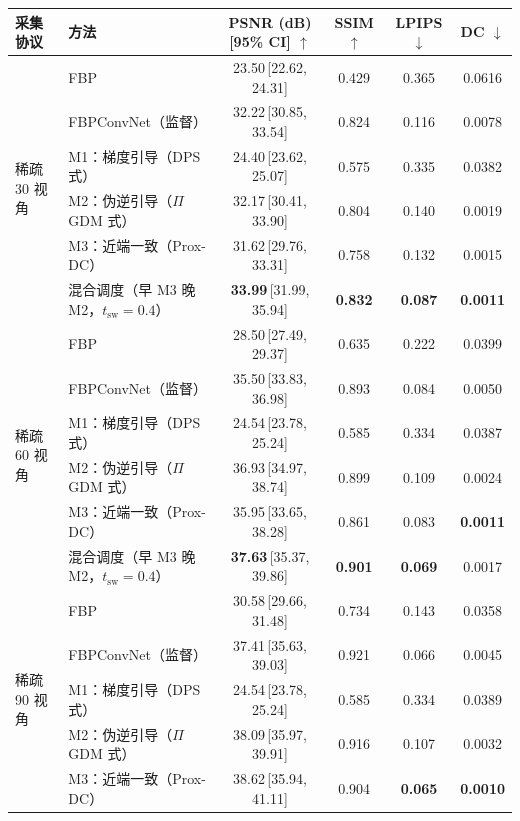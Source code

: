 \begin{tabular}{llcccc}
\toprule
采集协议 & 方法 & PSNR (dB) [95\% CI] $\uparrow$ & SSIM $\uparrow$ & LPIPS $\downarrow$ & DC $\downarrow$ \\
\midrule
\multirow{6}{*}{稀疏 30 视角}
 & FBP & 23.50\,{\scriptsize[22.62, 24.31]} & 0.429 & 0.365 & 0.0616 \\
 & FBPConvNet（监督） & 32.22\,{\scriptsize[30.85, 33.54]} & 0.824 & 0.116 & 0.0078 \\
 & M1：梯度引导（DPS 式） & 24.40\,{\scriptsize[23.62, 25.07]} & 0.575 & 0.335 & 0.0382 \\
 & M2：伪逆引导（$\Pi$GDM 式） & 32.17\,{\scriptsize[30.41, 33.90]} & 0.804 & 0.140 & 0.0019 \\
 & M3：近端一致（Prox-DC） & 31.62\,{\scriptsize[29.76, 33.31]} & 0.758 & 0.132 & 0.0015 \\
 & 混合调度（早 M3 晚 M2，$t_{\mathrm{sw}}{=}0.4$） & \textbf{33.99}\,{\scriptsize[31.99, 35.94]} & \textbf{0.832} & \textbf{0.087} & \textbf{0.0011} \\
\midrule
\multirow{6}{*}{稀疏 60 视角}
 & FBP & 28.50\,{\scriptsize[27.49, 29.37]} & 0.635 & 0.222 & 0.0399 \\
 & FBPConvNet（监督） & 35.50\,{\scriptsize[33.83, 36.98]} & 0.893 & 0.084 & 0.0050 \\
 & M1：梯度引导（DPS 式） & 24.54\,{\scriptsize[23.78, 25.24]} & 0.585 & 0.334 & 0.0387 \\
 & M2：伪逆引导（$\Pi$GDM 式） & 36.93\,{\scriptsize[34.97, 38.74]} & 0.899 & 0.109 & 0.0024 \\
 & M3：近端一致（Prox-DC） & 35.95\,{\scriptsize[33.65, 38.28]} & 0.861 & 0.083 & \textbf{0.0011} \\
 & 混合调度（早 M3 晚 M2，$t_{\mathrm{sw}}{=}0.4$） & \textbf{37.63}\,{\scriptsize[35.37, 39.86]} & \textbf{0.901} & \textbf{0.069} & 0.0017 \\
\midrule
\multirow{6}{*}{稀疏 90 视角}
 & FBP & 30.58\,{\scriptsize[29.66, 31.48]} & 0.734 & 0.143 & 0.0358 \\
 & FBPConvNet（监督） & 37.41\,{\scriptsize[35.63, 39.03]} & 0.921 & 0.066 & 0.0045 \\
 & M1：梯度引导（DPS 式） & 24.54\,{\scriptsize[23.78, 25.24]} & 0.585 & 0.334 & 0.0389 \\
 & M2：伪逆引导（$\Pi$GDM 式） & 38.09\,{\scriptsize[35.97, 39.91]} & 0.916 & 0.107 & 0.0032 \\
 & M3：近端一致（Prox-DC） & 38.62\,{\scriptsize[35.94, 41.11]} & 0.904 & \textbf{0.065} & \textbf{0.0010} \\

\end{tabular}
